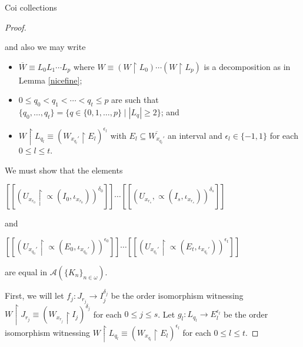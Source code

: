 \documentclass{amsart}
\theoremstyle{definition}\newtheorem{theorem}{Theorem}
\theoremstyle{definition}\newtheorem*{A}{Main Theorem}
\theoremstyle{definition}\newtheorem*{B}{Theorem \ref{elementaryequiv}}
\theoremstyle{definition}\newtheorem*{C}{Theorem \ref{continuous}}
\theoremstyle{definition}\newtheorem*{D}{Theorem \ref{bigisomorphism2}}
\theoremstyle{definition}\newtheorem{bigtheorem}{Main Theorem}
\numberwithin{theorem}{section}
\theoremstyle{definition}\newtheorem{corollary}[theorem]{Corollary}
\theoremstyle{definition}\newtheorem{proposition}[theorem]{Proposition}
\theoremstyle{definition}\newtheorem{definition}[theorem]{Definition}
\theoremstyle{definition}\newtheorem{question}[theorem]{Question}
\theoremstyle{definition}\newtheorem{example}[theorem]{Example}
\theoremstyle{definition}\newtheorem{remark}[theorem]{Remark}
\theoremstyle{definition}\newtheorem{note}[theorem]{Note}
\theoremstyle{definition}\newtheorem{lemma}[theorem]{Lemma}
\theoremstyle{definition}\newtheorem{fact}[theorem]{Fact}
\theoremstyle{definition}\newtheorem{define}[theorem]{Definition}
\theoremstyle{definition}\newtheorem{claim}[theorem]{Claim}
\theoremstyle{definition}\newtheorem{obs}[theorem]{Observation}
\theoremstyle{definition}\newtheorem{definitions}[theorem]{Definitions}
\begin{document}
\begin{section}{Coi collections}
\begin{proof}
\begin{itemize}
\end{itemize}

\noindent and also we may write

\begin{itemize}

\item $\overline{W} \equiv L_0L_1 \cdots L_p$ where $W \equiv (W \upharpoonright L_0) \cdots (W \upharpoonright L_p)$ is a decomposition as in Lemma \ref{nicefine};

\item $0 \leq q_0 < q_1 < \cdots < q_t \leq p$ are such that $\{q_0, \ldots, q_t\} = \{q \in \{0, 1, \ldots, p\}\mid |L_q| \geq 2\}$; and 

\item $W \upharpoonright L_{q_l} \equiv (W_{x_{q_l}'} \upharpoonright E_l)^{\epsilon_l}$ with $E_l \subseteq \overline{W_{x_{q_l}'}}$ an interval and $\epsilon_l \in \{-1, 1\}$ for each $0 \leq l \leq t$.
\end{itemize}

\noindent We must show that the elements 

\begin{center}
$[[(U_{x_{r_0}} \upharpoonright \varpropto(I_0, \iota_{x_{r_0}}))^{\delta_0}]]\cdots[[(U_{x_{r_s}}, \varpropto(I_s, \iota_{x_{r_s}}))^{\delta_s}]]$
\end{center}

\noindent and

\begin{center}
$[[(U_{x_{q_0}'} \upharpoonright \varpropto(E_0, \iota_{x_{q_0}'}))^{\epsilon_0}]]\cdots[[(U_{x_{q_t}'} \upharpoonright \varpropto(E_t, \iota_{x_{q_t}'}))^{\epsilon_t}]]$
\end{center}

\noindent are equal in $\mathcal{A}(\{K_n\}_{n \in \omega})$.


First, we will let $f_{j}: J_{r_j} \rightarrow I_j^{\delta_j}$ be the order isomorphism witnessing $W \upharpoonright J_{r_j} \equiv  (W_{x_{r_j}} \upharpoonright I_j)^{\delta_j}$ for each $0 \leq j \leq s$.  Let $g_l: L_{q_l} \rightarrow E_l^{\epsilon_l}$ be the order isomorphism witnessing $W \upharpoonright L_{q_l} \equiv (W_{x_{q_l}} \upharpoonright E_l)^{\epsilon_l}$ for each $0 \leq l \leq t$.



\end{proof}
\end{section}
\end{document}
